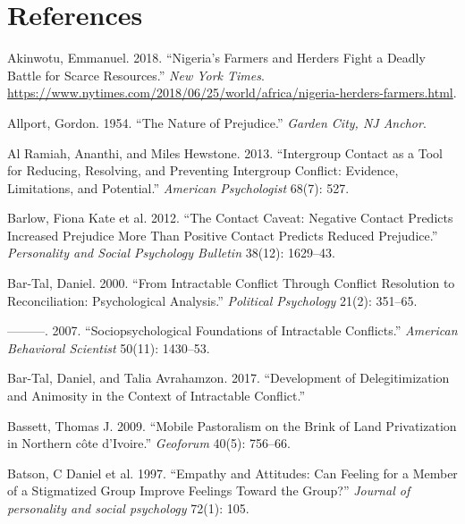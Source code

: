 \documentclass[11pt]{article}
\begin{document}
\hypertarget{references}{%
\section*{References}\label{references}}

\hypertarget{refs}{}
\leavevmode\hypertarget{ref-nyt2018nigeria}{}%
Akinwotu, Emmanuel. 2018. ``Nigeria's Farmers and Herders Fight a Deadly
Battle for Scarce Resources.'' \emph{New York Times}.
\url{https://www.nytimes.com/2018/06/25/world/africa/nigeria-herders-farmers.html}.

\leavevmode\hypertarget{ref-allport1954prejudice}{}%
Allport, Gordon. 1954. ``The Nature of Prejudice.'' \emph{Garden City,
NJ Anchor}.

\leavevmode\hypertarget{ref-al2013intergroup}{}%
Al Ramiah, Ananthi, and Miles Hewstone. 2013. ``Intergroup Contact as a
Tool for Reducing, Resolving, and Preventing Intergroup Conflict:
Evidence, Limitations, and Potential.'' \emph{American Psychologist}
68(7): 527.

\leavevmode\hypertarget{ref-barlow2012contact}{}%
Barlow, Fiona Kate et al. 2012. ``The Contact Caveat: Negative Contact
Predicts Increased Prejudice More Than Positive Contact Predicts Reduced
Prejudice.'' \emph{Personality and Social Psychology Bulletin} 38(12):
1629--43.

\leavevmode\hypertarget{ref-bar2000intractable}{}%
Bar-Tal, Daniel. 2000. ``From Intractable Conflict Through Conflict
Resolution to Reconciliation: Psychological Analysis.'' \emph{Political
Psychology} 21(2): 351--65.

\leavevmode\hypertarget{ref-bar2007sociopsychological}{}%
---------. 2007. ``Sociopsychological Foundations of Intractable
Conflicts.'' \emph{American Behavioral Scientist} 50(11): 1430--53.

\leavevmode\hypertarget{ref-bar2017development}{}%
Bar-Tal, Daniel, and Talia Avrahamzon. 2017. ``Development of
Delegitimization and Animosity in the Context of Intractable Conflict.''

\leavevmode\hypertarget{ref-bassett2009mobile}{}%
Bassett, Thomas J. 2009. ``Mobile Pastoralism on the Brink of Land
Privatization in Northern côte d'Ivoire.'' \emph{Geoforum} 40(5):
756--66.

\leavevmode\hypertarget{ref-batson1997empathy}{}%
Batson, C Daniel et al. 1997. ``Empathy and Attitudes: Can Feeling for a
Member of a Stigmatized Group Improve Feelings Toward the Group?''
\emph{Journal of personality and social psychology} 72(1): 105.
\end{document}
